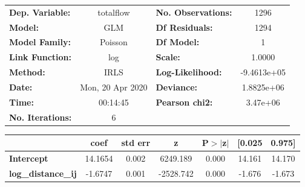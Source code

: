 \begin{center}
\begin{tabular}{lclc}
\toprule
\textbf{Dep. Variable:}    &    totalflow     & \textbf{  No. Observations:  } &      1296    \\
\textbf{Model:}            &       GLM        & \textbf{  Df Residuals:      } &      1294    \\
\textbf{Model Family:}     &     Poisson      & \textbf{  Df Model:          } &         1    \\
\textbf{Link Function:}    &       log        & \textbf{  Scale:             } &     1.0000   \\
\textbf{Method:}           &       IRLS       & \textbf{  Log-Likelihood:    } & -9.4613e+05  \\
\textbf{Date:}             & Mon, 20 Apr 2020 & \textbf{  Deviance:          } &  1.8825e+06  \\
\textbf{Time:}             &     00:14:45     & \textbf{  Pearson chi2:      } &   3.47e+06   \\
\textbf{No. Iterations:}   &        6         & \textbf{                     } &              \\
\bottomrule
\end{tabular}
\begin{tabular}{lcccccc}
                           & \textbf{coef} & \textbf{std err} & \textbf{z} & \textbf{P$> |$z$|$} & \textbf{[0.025} & \textbf{0.975]}  \\
\midrule
\textbf{Intercept}         &      14.1654  &        0.002     &  6249.189  &         0.000        &       14.161    &       14.170     \\
\textbf{log\_distance\_ij} &      -1.6747  &        0.001     & -2528.742  &         0.000        &       -1.676    &       -1.673     \\
\bottomrule
\end{tabular}
\end{center}